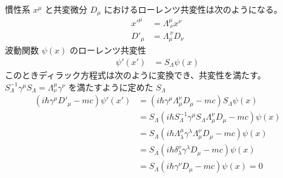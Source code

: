 \documentclass[uplatex,dvipdfmx,a4paper,11pt]{jlreq}
\theoremstyle{definition}
\numberwithin{equation}{section}
\begin{document}
慣性系 $x^\mu$ と共変微分 $D_\mu$ におけるローレンツ共変性は次のようになる。
\begin{align}
  x'^\mu & = \Lambda^\mu_{\ \nu}x^\nu \\
  D'_\mu & = \Lambda_\mu^{\ \nu}D_\nu
\end{align}
波動関数 $\psi(x)$ のローレンツ共変性
\begin{align}
  \psi'(x') & = S_\Lambda\psi(x)
\end{align}
このときディラック方程式は次のように変換でき、共変性を満たす。
$S_\Lambda^{-1}\gamma^\mu S_\Lambda = \Lambda_\nu^\mu\gamma^\nu$ を満たすように定めた $S_\Lambda$
\begin{align}
  (i\hbar\gamma^\mu D'_\mu - mc)\psi'(x') & = (i\hbar\gamma^\mu \Lambda^\nu_\mu D_\mu - mc)S_\Lambda\psi(x)                           \\
                                          & = S_\Lambda(i\hbar S_\Lambda^{-1}\gamma^\mu S_\Lambda\Lambda_\mu^\nu D_\mu - mc)\psi(x)   \\
                                          & = S_\Lambda(i\hbar\Lambda_{\lambda}^{\mu}\gamma^\lambda\Lambda_\mu^\nu D_\mu - mc)\psi(x) \\
                                          & = S_\Lambda(i\hbar\delta_{\lambda}^\nu\gamma^\lambda D_\mu - mc)\psi(x)                   \\
                                          & = S_\Lambda(i\hbar\gamma^\nu D_\mu - mc)\psi(x) = 0
\end{align}
\end{document}
